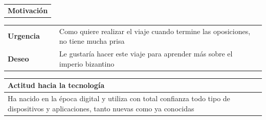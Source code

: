 \documentclass[11pt]{article}
\begin{document}
\begin{table}[H]
  \begin{tabular}{l}
    \textbf{Motivación} 
  \end{tabular}

  \begin{tabular}{p{0.2\linewidth}|p{0.8\linewidth}}
    \toprule
    \textbf{Urgencia} & Como quiere realizar el viaje cuando termine las oposiciones, no tiene mucha prisa\\
    \textbf{Deseo}  & Le gustaría hacer este viaje para aprender más sobre el imperio bizantino \\
    \bottomrule
  \end{tabular}

  \begin{tabular}{p{1.028\linewidth}}
    \textbf{Actitud hacia la tecnología}\\
    \midrule
    Ha nacido en la época digital y utiliza con total confianza todo tipo de dispositivos y aplicaciones, tanto nuevas como ya conocidas
  \end{tabular}
\end{table}

\newpage
\end{document}
